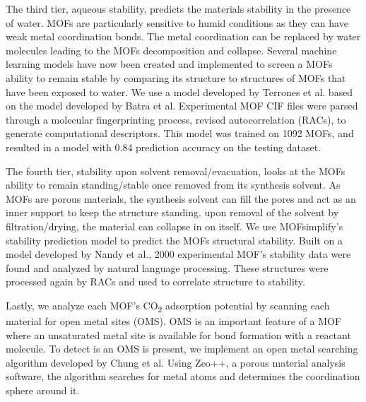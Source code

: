 \documentclass[twoside,twocolumn,9pt]{article}
\begin{document}
\par

The third tier, aqueous stability, predicts the materials stability in the presence of water. MOFs are particularly sensitive to humid conditions as they can have weak metal coordination bonds\cite{an_stability_2024}. The metal coordination can be replaced by water molecules leading to the MOFs decomposition and collapse\cite{yu_topological_2021}. Several machine learning models have now been created and implemented to screen a MOFs ability to remain stable by comparing its structure to structures of MOFs that have been exposed to water. We use a model developed by Terrones et al.\cite{terrones_metalorganic_2024} based on the model developed by Batra et al.\cite{batra_prediction_2020} Experimental MOF CIF files were parsed through a molecular fingerprinting process, revised autocorrelation (RACs)\cite{noauthor_rdkit_nodate}, to generate computational descriptors. This model was trained on 1092 MOFs, and resulted in a model with 0.84 prediction accuracy on the testing dataset. 

\par

The fourth tier, stability upon solvent removal/evacuation, looks at the MOFs ability to remain standing/stable once removed from its synthesis solvent. As MOFs are porous materials, the synthesis solvent can fill the pores and act as an inner support to keep the structure standing. upon removal of the solvent by filtration/drying, the material can collapse in on itself\cite{an_stability_2024}. We use MOFsimplify's stability prediction model to predict the MOFs structural stability. Built on a model developed by Nandy et al.\cite{nandy_mofsimplify_2022, nandy_using_2021}, 2000 experimental MOF's stability data were found and analyzed by natural language processing. These structures were processed again by RACs and used to correlate structure to stability. 

\par

Lastly, we analyze each MOF's CO\textsubscript{2} adsorption potential by scanning each material for open metal sites (OMS)\cite{li_mof-based_2020}. OMS is an important feature of a MOF where an unsaturated metal site is available for bond formation with a reactant molecule\cite{hai_high-performance_2018}. To detect is an OMS is present, we implement an open metal searching algorithm developed by Chung et al.\cite{chung_advances_2019} Using Zeo++\cite{willems_algorithms_2012, martin_construction_2014}, a porous material analysis software, the algorithm searches for metal atoms and determines the coordination sphere around it. 
\end{document}
